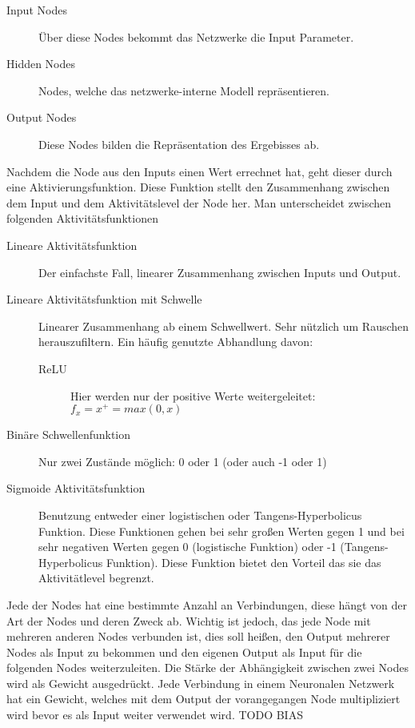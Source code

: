 \documentclass[pdftex,a4paper,halfparskip]{scrartcl}
\begin{document}
\begin{description}
	\item[Input Nodes] Über diese Nodes bekommt das Netzwerke die Input Parameter.
	\item[Hidden Nodes] Nodes, welche das netzwerke-interne Modell repräsentieren.
	\item[Output Nodes] Diese Nodes bilden die Repräsentation des Ergebisses ab.
\end{description}

Nachdem die Node aus den Inputs einen Wert errechnet hat, geht dieser durch eine Aktivierungsfunktion. Diese Funktion stellt den Zusammenhang zwischen dem Input und dem Aktivitätslevel der Node her. Man unterscheidet zwischen folgenden Aktivitätsfunktionen

\begin{description}
	\item[Lineare Aktivitätsfunktion] Der einfachste Fall, linearer Zusammenhang zwischen Inputs und Output.
	\item[Lineare Aktivitätsfunktion mit Schwelle] Linearer Zusammenhang ab einem Schwellwert. Sehr nützlich um Rauschen herauszufiltern. Ein häufig genutzte Abhandlung davon:
	\begin{description}
		\item[ReLU] Hier werden nur der positive Werte weitergeleitet: \(f_x = x^+ = max(0,x) \)
	\end{description}
	\item[Binäre Schwellenfunktion] Nur zwei Zustände möglich: 0 oder 1 (oder auch -1 oder 1)
	\item[Sigmoide Aktivitätsfunktion] Benutzung entweder einer logistischen oder Tangens-Hyperbolicus Funktion. Diese Funktionen gehen bei sehr großen Werten gegen 1 und bei sehr negativen Werten gegen 0 (logistische Funktion) oder -1 (Tangens-Hyperbolicus Funktion). Diese Funktion bietet den Vorteil das sie das Aktivitätlevel begrenzt.
\end{description} 

Jede der Nodes hat eine bestimmte Anzahl an Verbindungen, diese hängt von der Art der Nodes und deren Zweck ab. Wichtig ist jedoch, das jede Node mit mehreren anderen Nodes verbunden ist, dies soll heißen, den Output mehrerer Nodes als Input zu bekommen und den eigenen Output als Input für die folgenden Nodes weiterzuleiten. Die Stärke der Abhängigkeit zwischen zwei Nodes wird als Gewicht ausgedrückt. Jede Verbindung in einem Neuronalen Netzwerk hat ein Gewicht, welches mit dem Output der vorangegangen Node multipliziert wird bevor es als Input weiter verwendet wird. TODO BIAS
\end{document}
